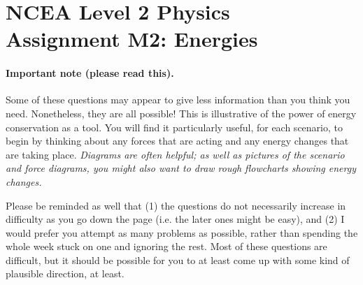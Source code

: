 \documentclass[answers]{exam}
\begin{document}
\section*{NCEA Level 2 Physics\\Assignment M2: Energies}

\paragraph{Important note (please read this).} Some of these questions may appear to give less information than you think
you need. Nonetheless, they are all possible! This is illustrative of the power of energy conservation as a tool. You will
find it particularly useful, for each scenario, to begin by thinking about any forces that are acting and any energy changes
that are taking place. \emph{Diagrams are often helpful; as well as pictures of the scenario and force diagrams, you might
also want to draw rough flowcharts showing energy changes.}

Please be reminded as well that (1) the questions do not necessarily increase in difficulty as you go down the page (i.e.
the later ones might be easy), and (2) I would prefer you attempt as many problems as possible, rather than spending the
whole week stuck on one and ignoring the rest. Most of these questions are difficult, but it should be possible for you
to at least come up with some kind of plausible direction, at least.
\end{document}

